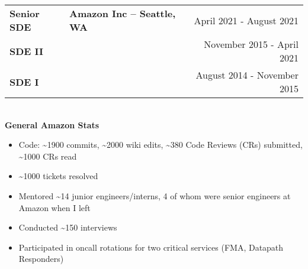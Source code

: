 \documentclass{res}
\newlength{\vsep}
\begin{document}
\begin{resume}
   \begin{tabularx}{\textwidth}{@{}>{\bf}l>{\large\bf\centering\arraybackslash}Xr@{}}
   Senior SDE & Amazon Inc -- Seattle, WA & April 2021 - August 2021\\
   SDE II & & November 2015 - April 2021\\
   SDE I & & August 2014 - November 2015\vspace{\vsep}\\
   \end{tabularx}\\
   {\large \bf General Amazon Stats}
   \begin{itemize}
   \item Code: \textasciitilde 1900 commits, \textasciitilde 2000 wiki edits, \textasciitilde 380 Code Reviews (CRs) submitted, \textasciitilde 1000 CRs read
   \item \textasciitilde 1000 tickets resolved
   \item Mentored \textasciitilde 14 junior engineers/interns, 4 of whom were senior engineers at Amazon when I left
   \item Conducted \textasciitilde 150 interviews
   \item Participated in oncall rotations for two critical services (FMA, Datapath Responders)
   \end{itemize}
   

\end{resume}
\end{document}
